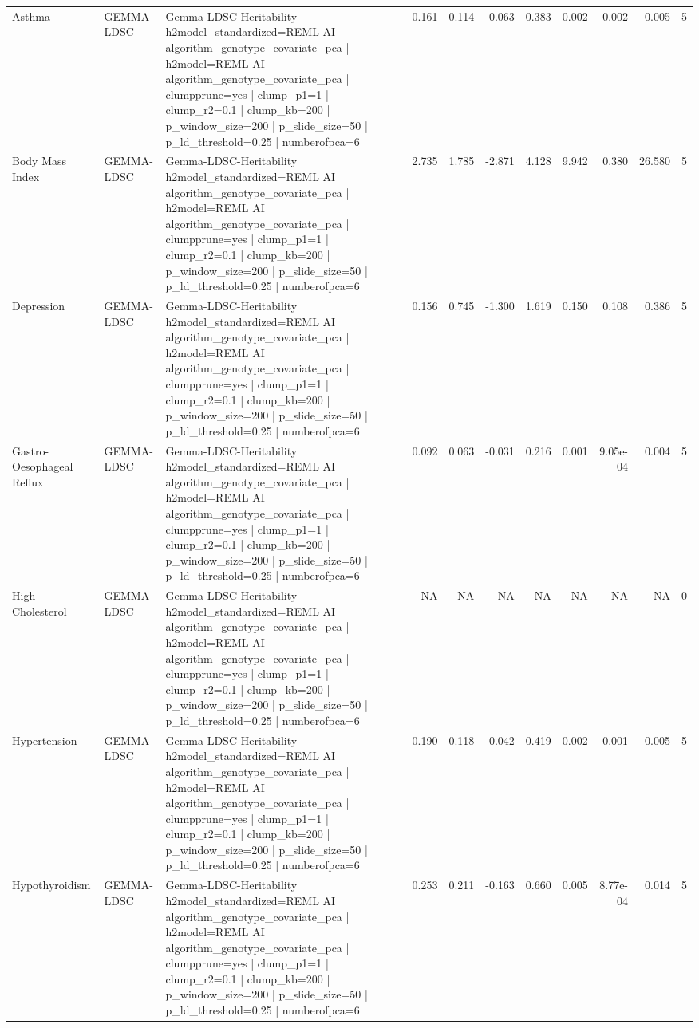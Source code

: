\begin{landscape}
\begin{longtable}{p{2.4cm}p{1.8cm}p{6.0cm}rrrrrrrr}
Asthma & GEMMA-LDSC & Gemma-LDSC-Heritability | h2model\_standardized=REML AI algorithm\_genotype\_covariate\_pca | h2model=REML AI algorithm\_genotype\_covariate\_pca | clumpprune=yes | clump\_p1=1 | clump\_r2=0.1 | clump\_kb=200 | p\_window\_size=200 | p\_slide\_size=50 | p\_ld\_threshold=0.25 | numberofpca=6 & 0.161 & 0.114 & -0.063 & 0.383 & 0.002 & 0.002 & 0.005 & 5 \\
Body Mass Index & GEMMA-LDSC & Gemma-LDSC-Heritability | h2model\_standardized=REML AI algorithm\_genotype\_covariate\_pca | h2model=REML AI algorithm\_genotype\_covariate\_pca | clumpprune=yes | clump\_p1=1 | clump\_r2=0.1 | clump\_kb=200 | p\_window\_size=200 | p\_slide\_size=50 | p\_ld\_threshold=0.25 | numberofpca=6 & 2.735 & 1.785 & -2.871 & 4.128 & 9.942 & 0.380 & 26.580 & 5 \\
Depression & GEMMA-LDSC & Gemma-LDSC-Heritability | h2model\_standardized=REML AI algorithm\_genotype\_covariate\_pca | h2model=REML AI algorithm\_genotype\_covariate\_pca | clumpprune=yes | clump\_p1=1 | clump\_r2=0.1 | clump\_kb=200 | p\_window\_size=200 | p\_slide\_size=50 | p\_ld\_threshold=0.25 | numberofpca=6 & 0.156 & 0.745 & -1.300 & 1.619 & 0.150 & 0.108 & 0.386 & 5 \\
Gastro-Oesophageal Reflux & GEMMA-LDSC & Gemma-LDSC-Heritability | h2model\_standardized=REML AI algorithm\_genotype\_covariate\_pca | h2model=REML AI algorithm\_genotype\_covariate\_pca | clumpprune=yes | clump\_p1=1 | clump\_r2=0.1 | clump\_kb=200 | p\_window\_size=200 | p\_slide\_size=50 | p\_ld\_threshold=0.25 | numberofpca=6 & 0.092 & 0.063 & -0.031 & 0.216 & 0.001 & 9.05e-04 & 0.004 & 5 \\
High Cholesterol & GEMMA-LDSC & Gemma-LDSC-Heritability | h2model\_standardized=REML AI algorithm\_genotype\_covariate\_pca | h2model=REML AI algorithm\_genotype\_covariate\_pca | clumpprune=yes | clump\_p1=1 | clump\_r2=0.1 | clump\_kb=200 | p\_window\_size=200 | p\_slide\_size=50 | p\_ld\_threshold=0.25 | numberofpca=6 & NA & NA & NA & NA & NA & NA & NA & 0 \\
Hypertension & GEMMA-LDSC & Gemma-LDSC-Heritability | h2model\_standardized=REML AI algorithm\_genotype\_covariate\_pca | h2model=REML AI algorithm\_genotype\_covariate\_pca | clumpprune=yes | clump\_p1=1 | clump\_r2=0.1 | clump\_kb=200 | p\_window\_size=200 | p\_slide\_size=50 | p\_ld\_threshold=0.25 | numberofpca=6 & 0.190 & 0.118 & -0.042 & 0.419 & 0.002 & 0.001 & 0.005 & 5 \\
Hypothyroidism & GEMMA-LDSC & Gemma-LDSC-Heritability | h2model\_standardized=REML AI algorithm\_genotype\_covariate\_pca | h2model=REML AI algorithm\_genotype\_covariate\_pca | clumpprune=yes | clump\_p1=1 | clump\_r2=0.1 | clump\_kb=200 | p\_window\_size=200 | p\_slide\_size=50 | p\_ld\_threshold=0.25 | numberofpca=6 & 0.253 & 0.211 & -0.163 & 0.660 & 0.005 & 8.77e-04 & 0.014 & 5 \\

\end{longtable}
\end{landscape}

